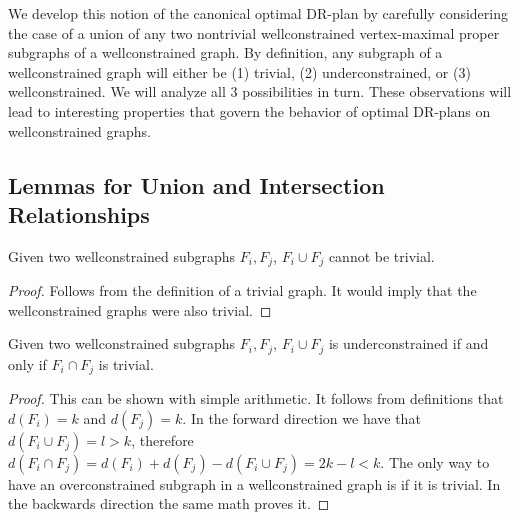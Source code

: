 \documentclass[11pt]{article}
\begin{document}
We develop this notion of the canonical optimal DR-plan by carefully considering the case of a union of any two nontrivial wellconstrained vertex-maximal proper subgraphs of a wellconstrained graph. By definition, any subgraph of a wellconstrained graph will either be (1) trivial, (2) underconstrained, or (3) wellconstrained. We will analyze all 3 possibilities in turn. These observations will lead to interesting properties that govern the behavior of optimal DR-plans on wellconstrained graphs.



\subsection{Lemmas for Union and Intersection Relationships}
\begin{lemma}\label{t-l1}
Given two wellconstrained subgraphs $F_i,F_j$, $F_i\cup F_j$ cannot be trivial.
\end{lemma}

\begin{proof}

Follows from the definition of a trivial graph. It would imply that the wellconstrained graphs were also trivial.
\end{proof}


\begin{lemma}\label{uc-l1}
Given two wellconstrained subgraphs $F_i,F_j$, $F_i\cup F_j$ is underconstrained if and only if $F_i\cap F_j$ is trivial.
\end{lemma}

\begin{proof}
This can be shown with simple arithmetic. It follows from definitions that $d(F_i)=k$ and $d(F_j)=k$. In the forward direction we have that $d(F_i\cup F_j)=l>k$, therefore $d(F_i\cap F_j)=d(F_i)+d(F_j)-d(F_i\cup F_j)=2k-l<k$. The only way to have an overconstrained subgraph in a wellconstrained graph is if it is trivial. In the backwards direction the same math proves it.
\end{proof}
\end{document}
